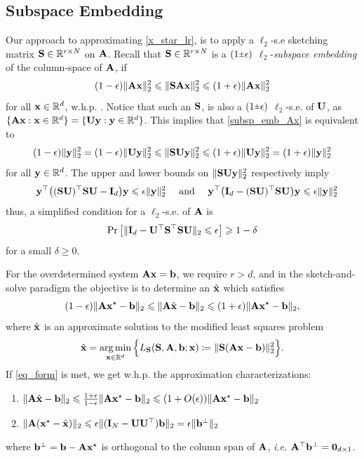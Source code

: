\documentclass[journal,letterpaper,onecolumn,twoside,nofonttune]{IEEEtran}
\newcommand{\R}{\mathbb{R}}
\newcommand{\rpm}{\raisebox{.2ex}{$\scriptstyle\pm$}}
\newcommand{\bb}{\bold{b}}
\newcommand{\Ub}{\bold{U}}
\newcommand{\xb}{\bold{x}}
\newcommand{\xbh}{\hat{\xb}}
\newcommand{\yb}{\bold{y}}
\newcommand{\Ab}{\bold{A}}
\newcommand{\Ib}{\bold{I}}
\newcommand{\Sb}{\bold{S}}
\DeclareMathOperator*{\argmin}{arg\,min}
\begin{document}
\subsection{Subspace Embedding}

Our approach to approximating \eqref{x_star_lr}, is to apply a $\ell_2$-s.e sketching matrix $\Sb\in\R^{r\times N}$ on $\Ab$. Recall that $\Sb\in\R^{r\times N}$ is a $(1\rpm\epsilon)$ $\ell_2$-\textit{subspace embedding} of the column-space of $\Ab$, if 
\begin{equation}
\label{subsp_emb_Ax}
  (1-\epsilon)\|\Ab\xb\|_2^2 \leqslant \|\Sb\Ab\xb\|_2^2 \leqslant (1+\epsilon)\|\Ab\xb\|_2^2
\end{equation}
for all $\xb\in\R^d$, w.h.p. \cite{Woo14}. Notice that such an $\Sb$, is also a $(1\rpm\epsilon)$ $\ell_2$-s.e. of $\Ub$, as $\{\Ab\xb:\xb\in\R^{d}\}=\{\Ub\yb:\yb\in\R^d\}$. This implies that \eqref{subsp_emb_Ax} is equivalent to
\begin{equation}
\label{subsp_emb}
  (1-\epsilon)\|\yb\|_2^2 = (1-\epsilon)\|\Ub\yb\|_2^2 \leqslant \|\Sb\Ub\yb\|_2^2 \leqslant (1+\epsilon)\|\Ub\yb\|_2^2 = (1+\epsilon)\|\yb\|_2^2
\end{equation}
for all $\yb\in\R^{d}$. The upper and lower bounds on $\|\Sb\Ub\yb\|_2^2$ respectively imply
$$ \quad \yb^\top\big((\Sb\Ub)^\top\Sb\Ub-\Ib_d\big)\yb \leqslant \epsilon\|\yb\|_2^2 \quad \text{ and } \quad \yb^\top\big(\Ib_d-(\Sb\Ub)^\top\Sb\Ub\big)\yb \leqslant \epsilon\|\yb\|_2^2 $$
thus, a simplified condition for a $\ell_2$-s.e. of $\Ab$ is
\begin{equation}
\label{eq_form}  %
  \Pr\big[\|\Ib_d-\Ub^\top\Sb^\top\Sb\Ub\|_2\leqslant\epsilon\big]\geqslant 1-\delta
\end{equation}
for a small $\delta\geqslant0$.

For the overdetermined system $\Ab\xb=\bb$, we require $r>d$, and in the sketch-and-solve paradigm the objective is to determine an $\xbh$ which satisfies
\begin{equation}
\label{appr_xbh}  %
  (1-\epsilon)\|\Ab\xb^\star-\bb\|_2 \leqslant \|\Ab\xbh-\bb\|_2 \leqslant (1+\epsilon)\|\Ab\xb^\star-\bb\|_2,
\end{equation}
where $\xbh$ is an approximate solution to the modified least squares problem
\begin{equation}
\label{mod_OLS}  %
  \xbh = \argmin_{\xb\in\R^d} \Big\{L_\Sb(\Sb,\Ab,\bb;\xb)\coloneqq\|\Sb(\Ab\xb-\bb)\|_2^2\Big\}.
\end{equation}
If \eqref{eq_form} is met, we get w.h.p. the approximation characterizations:
\begin{enumerate}
    \item $\|\Ab\xbh-\bb\|_2 \leqslant \frac{1+\epsilon}{1-\epsilon}\|\Ab\xb^\star-\bb\|_2 \leqslant (1+O(\epsilon))\|\Ab\xb^\star-\bb\|_2$
    \item $\|\Ab(\xb^\star-\xbh)\|_2\leqslant\epsilon\|(\Ib_N-\Ub\Ub^\top)\bb\|_2=\epsilon\|\bb^{\perp}\|_2$
\end{enumerate}
where $\bb^\perp=\bb-\Ab\xb^\star$ is orthogonal to the column span of $\Ab$, \textit{i.e.} $\Ab^\top\bb^\perp=\bold{0}_{d\times 1}$.
\end{document}
